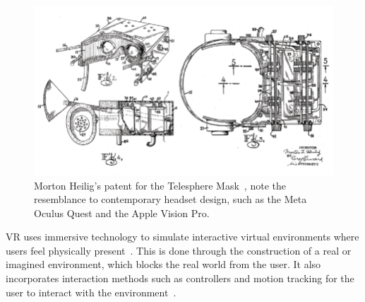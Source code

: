 \begin{figure}
    \centering
    \includegraphics[width=\linewidth]{figures/telesphere-mask.png}
    \caption{Morton Heilig's patent for the Telesphere Mask~\cite{Heilig1994}, note the resemblance to contemporary headset design, such as the Meta Oculus Quest and the Apple Vision Pro.}
    \label{fig:telesphere}
\end{figure}

VR uses immersive technology to simulate interactive virtual environments where users feel physically present~\cite{Wohlgenannt2020, Bowman2007}.
This is done through the construction of a real or imagined environment, which blocks the real world from the user.
It also incorporates interaction methods such as controllers and motion tracking for the user to interact with the environment~\cite{Brooks1999, Barfield2000}.


